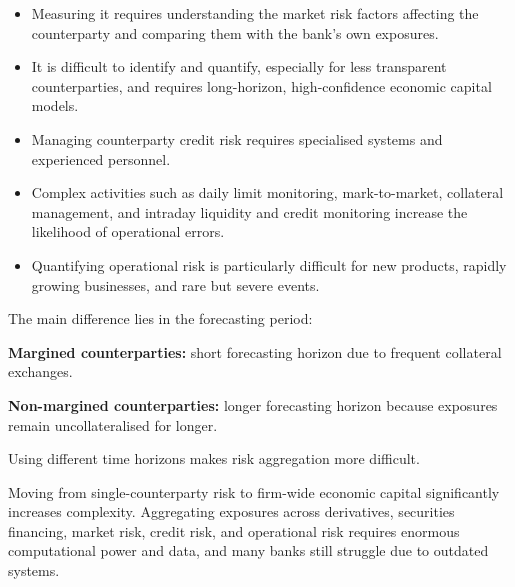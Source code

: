 \begin{itemize}
\item Measuring it requires understanding the market risk factors affecting the
counterparty and comparing them with the bank's own exposures.
\item It is difficult to identify and quantify, especially for less transparent
counterparties, and requires long-horizon, high-confidence economic capital models.
\end{itemize}


\begin{itemize}
\item Managing counterparty credit risk requires specialised systems and
experienced personnel.
\item Complex activities such as daily limit monitoring, mark-to-market, collateral
management, and intraday liquidity and credit monitoring increase the likelihood
of operational errors.
\item Quantifying operational risk is particularly difficult for new products,
rapidly growing businesses, and rare but severe events.
\end{itemize}


The main difference lies in the forecasting period:

\begin{lettered}
\item \textbf{Margined counterparties:} short forecasting horizon due to frequent
collateral exchanges.
\item \textbf{Non-margined counterparties:} longer forecasting horizon because
exposures remain uncollateralised for longer.
\end{lettered}

Using different time horizons makes risk aggregation more difficult.


Moving from single-counterparty risk to firm-wide economic capital significantly
increases complexity. Aggregating exposures across derivatives, securities
financing, market risk, credit risk, and operational risk requires enormous
computational power and data, and many banks still struggle due to outdated
systems.


